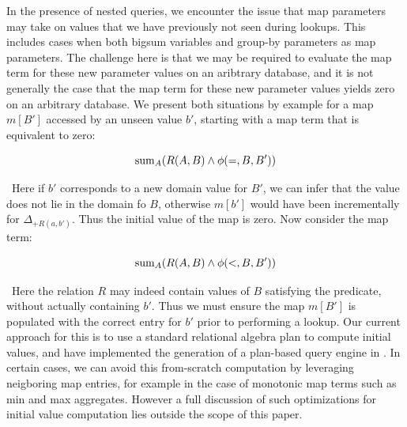 
In the presence of nested queries, we encounter the issue that map parameters
may take on values that we have previously not seen during lookups.  This
includes cases when both bigsum variables and group-by parameters as map
parameters.  The challenge here is that we may be required to evaluate the map
term for these new parameter values on an aribtrary database, and it is not
generally the case that the map term for these new parameter values yields zero
on an arbitrary database. We present both situations by example for a map
$m[B']$ accessed by an unseen value $b'$, starting with a map term that is equivalent to zero:

\vspace{-3mm}
\[\mathrm{sum}_{A}(R(A,B) \wedge \phi(=,B,B'))\]

\noindent~Here if $b'$ corresponds to a new domain value for $B'$, we can infer
that the value does not lie in the domain fo $B$, otherwise $m[b']$ would have
been incrementally for $\Delta_{+R(a,b')}$. Thus the initial value of the map is
zero. Now consider the map term:

\vspace{-3mm}
\[\mathrm{sum}_{A}(R(A,B)\wedge \phi(<, B, B'))\]

\noindent~Here the relation $R$ may indeed contain values of $B$ satisfying the
predicate, without actually containing $b'$. Thus we must ensure the map $m[B']$
is populated with the correct entry for $b'$ prior to performing a lookup. Our
current approach for this is to use a standard relational algebra plan to
compute initial values, and have implemented the generation of a plan-based
query engine in \compiler. In certain cases, we can avoid this from-scratch
computation by leveraging neigboring map entries, for example in the case of
monotonic map terms such as min and max aggregates. However a full discussion of
such optimizations for initial value computation lies outside the scope of this
paper.


